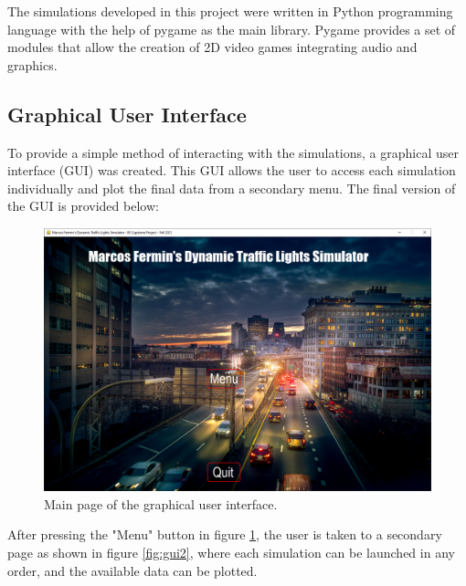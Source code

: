 \documentclass[12pt, a4paper,titlepage]{article}
\begin{document}
The simulations developed in this project were written in Python programming language with the help of pygame as the main library. Pygame provides a set of modules that allow the creation of 2D video games integrating audio and graphics.

\subsection{Graphical User Interface}
\label{subsec_gui}

To provide a simple method of interacting with the simulations, a graphical user interface (GUI) was created. This GUI allows the user to access each simulation individually and plot the final data from a secondary menu. The final version of the GUI is provided below:

\begin{figure}[H]
	\centering
	\includegraphics[width=\linewidth]{images/GUI_1}
	\caption{Main page of the graphical user interface.}
	\label{fig:gui1}
\end{figure}

After pressing the "Menu" button in figure \ref{fig:gui1}, the user is taken to a secondary page as shown in figure \ref{fig:gui2}, where each simulation can be launched in any order, and the available data can be plotted.
\end{document}
